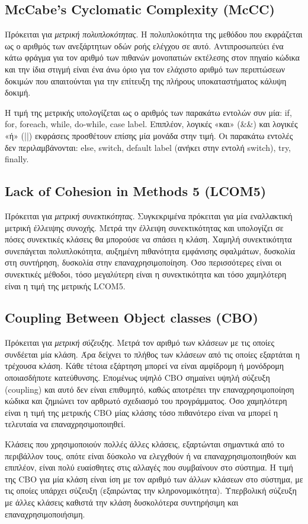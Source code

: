 \subsection{McCabe's Cyclomatic Complexity (McCC)}

Πρόκειται για \emph{μετρική πολυπλοκότητας}. Η πολυπλοκότητα της μεθόδου
που εκφράζεται ως ο αριθμός των ανεξάρτητων οδών ροής ελέγχου σε αυτό.
Αντιπροσωπεύει ένα κάτω φράγμα για τον αριθμό των πιθανών μονοπατιών
εκτέλεσης στον πηγαίο κώδικα και την ίδια στιγμή είναι ένα άνω όριο για
τον ελάχιστο αριθμό των περιπτώσεων δοκιμών που απαιτούνται για την
επίτευξη της πλήρους υποκαταστήματος κάλυψη δοκιμή.

Η τιμή της μετρικής υπολογίζεται ως ο αριθμός των παρακάτω εντολών συν
μία: if, for, foreach, while, do-while, case label. Επιπλέον, λογικές «και»
(\&\&) και λογικές «ή» (||) εκφράσεις προσθέτουν επίσης μία μονάδα στην τιμή. Οι
παρακάτω εντολές δεν περιλαμβάνονται: else, switch, default label
(ανήκει στην εντολή switch), try, finally.


\subsection{Lack of Cohesion in Methods 5  (LCOM5)}

Πρόκειται για \emph{μετρική συνεκτικότητας}. Συγκεκριμένα πρόκειται για
μία εναλλακτική μετρική έλλειψης συνοχής. Μετρά την
έλλειψη συνεκτικότητας και υπολογίζει σε πόσες συνεκτικές κλάσεις θα μπορούσε
να σπάσει η κλάση. Χαμηλή
συνεκτικότητα συνεπάγεται πολυπλοκότητα, αυξημένη πιθανότητα εμφάνισης
σφαλμάτων, δυσκολία στη συντήρηση, δυσκολία στην επαναχρησιμοποίηση. Όσο
περισσότερες είναι οι συνεκτικές μέθοδοι, τόσο μεγαλύτερη είναι η
συνεκτικότητα και τόσο χαμηλότερη είναι η τιμή της μετρικής LCOM5.

\subsection{Coupling Between Object classes (CBO)}

Πρόκειται για \emph{μετρική σύζευξης}. Μετρά τον αριθμό των κλάσεων με
τις οποίες συνδέεται μία κλάση. Άρα δείχνει το πλήθος των κλάσεων από
τις οποίες εξαρτάται η τρέχουσα κλάση. Κάθε τέτοια εξάρτηση μπορεί να
είναι αμφίδρομη ή μονόδρομη οποιασδήποτε κατεύθυνσης. Επομένως υψηλό CBO
σημαίνει υψηλή σύζευξη (coupling) και αυτό δεν είναι επιθυμητό, καθώς
αποτρέπει την επαναχρησιμοποίηση κώδικα και ζημιώνει τον αρθρωτό
σχεδιασμό του προγράμματος. Όσο χαμηλότερη είναι η τιμή της μετρικής CBO
μίας κλάσης τόσο πιθανότερο είναι να μπορεί η τελευταία να
επαναχρησιμοποιηθεί. 

Κλάσεις που χρησιμοποιούν πολλές άλλες κλάσεις, εξαρτώνται σημαντικά από
το περιβάλλον τους, οπότε είναι δύσκολο να ελεγχθούν ή να
επαναχρησιμοποιηθούν και επιπλέον, είναι πολύ ευαίσθητες στις αλλαγές
που συμβαίνουν στο σύστημα. Η τιμή της CBO για μία κλάση είναι ίση με
τον αριθμό των άλλων κλάσεων στο σύστημα, με τις οποίες υπάρχει σύζευξη
(εξαιρώντας την κληρονομικότητα). Υπερβολική σύζευξη με άλλες κλάσεις
καθιστά την κλάση δυσκολότερα συντηρήσιμη και επαναχρησιμοποιήσιμη.
